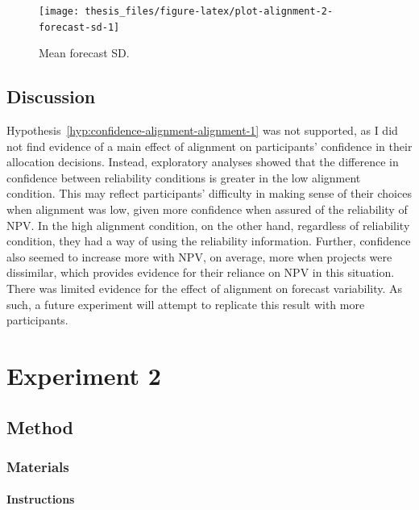 \documentclass[a4paper, nobind, dvipsnames]{templates/ociamthesis}
\theoremstyle{definition}
\theoremstyle{definition}
\theoremstyle{definition}
\theoremstyle{definition}
\theoremstyle{remark}
\begin{document}
\begin{figure}
\texttt{[image: thesis\_files/figure-latex/plot-alignment-2-forecast-sd-1]} \caption{Mean forecast SD.}\label{fig:plot-alignment-2-forecast-sd}
\end{figure}

\subsection{Discussion}

Hypothesis~\ref{hyp:confidence-alignment-alignment-1} was not supported, as I
did not find evidence of a main effect of alignment on participants' confidence
in their allocation decisions. Instead, exploratory analyses showed that the
difference in confidence between reliability conditions is greater in the low
alignment condition. This may reflect participants' difficulty in making sense
of their choices when alignment was low, given more confidence when assured of
the reliability of NPV. In the high alignment condition, on the other hand,
regardless of reliability condition, they had a way of using the reliability
information. Further, confidence also seemed to increase more with NPV, on
average, more when projects were dissimilar, which provides evidence for their
reliance on NPV in this situation. There was limited evidence for the effect of
alignment on forecast variability. As such, a future experiment will attempt to
replicate this result with more participants.

\hypertarget{alignment-3-appendix}{%
\section{Experiment 2}\label{alignment-3-appendix}}

\subsection{Method}

\subsubsection{Materials}

\hypertarget{instructions-materials-alignment-3-appendix}{%
\paragraph{Instructions}\label{instructions-materials-alignment-3-appendix}}
\end{document}

